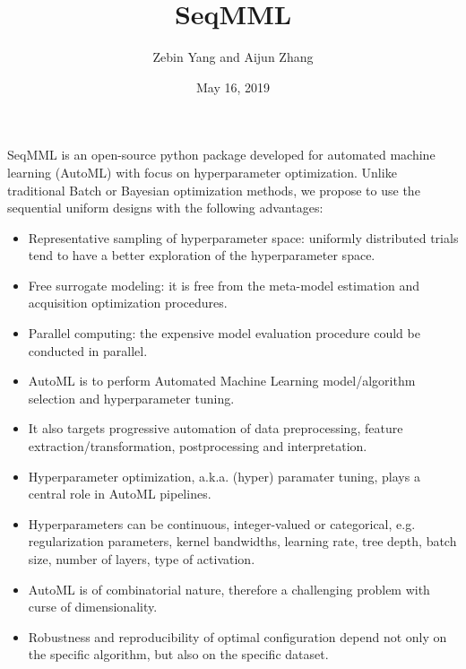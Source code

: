 \documentclass[letterpaper,10pt,english]{sphinxmanual}
\title{SeqMML}
\date{May 16, 2019}
\author{Zebin Yang and Aijun Zhang}
\begin{document}
\pagestyle{empty}
\sphinxmaketitle
\pagestyle{plain}
\sphinxtableofcontents
\pagestyle{normal}
\label{\detokenize{index::doc}}


SeqMML is an open-source python package developed for automated machine learning (AutoML) with focus on hyperparameter optimization. Unlike traditional Batch or Bayesian optimization methods, we propose to use the sequential uniform designs with the following advantages:
\begin{itemize}
\item {} 
Representative sampling of hyperparameter space: uniformly distributed trials tend to have a better exploration of the hyperparameter space.

\item {} 
Free surrogate modeling: it is free from the meta-model estimation and acquisition optimization procedures.

\item {} 
Parallel computing: the expensive model evaluation procedure could be conducted in parallel.

\end{itemize}

\begin{itemize}
\item {} 
AutoML is to perform Automated Machine Learning model/algorithm selection and hyperparameter tuning.

\item {} 
It also targets progressive automation of data preprocessing, feature extraction/transformation, postprocessing and interpretation.

\item {} 
Hyperparameter optimization, a.k.a. (hyper) paramater tuning, plays a central role in AutoML pipelines.

\end{itemize}


\begin{itemize}
\item {} 
Hyperparameters can be continuous, integer-valued or categorical, e.g. regularization parameters, kernel bandwidths, learning rate, tree depth, batch size, number of layers, type of activation.

\item {} 
AutoML is of combinatorial nature, therefore a challenging problem with curse of dimensionality.

\item {} 
Robustness and reproducibility of optimal configuration depend not only on the specific algorithm, but also on the specific dataset.

\end{itemize}
\end{document}

